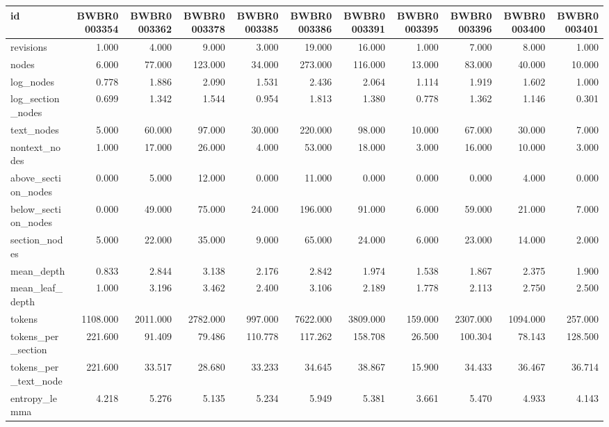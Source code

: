 \begin{tabular}{lrrrrrrrrrr}
\toprule
id & BWBR0003354 & BWBR0003362 & BWBR0003378 & BWBR0003385 & BWBR0003386 & BWBR0003391 & BWBR0003395 & BWBR0003396 & BWBR0003400 & BWBR0003401 \\
\midrule
revisions & 1.000 & 4.000 & 9.000 & 3.000 & 19.000 & 16.000 & 1.000 & 7.000 & 8.000 & 1.000 \\
\cline{1-11}
nodes & 6.000 & 77.000 & 123.000 & 34.000 & 273.000 & 116.000 & 13.000 & 83.000 & 40.000 & 10.000 \\
\cline{1-11}
log\_nodes & 0.778 & 1.886 & 2.090 & 1.531 & 2.436 & 2.064 & 1.114 & 1.919 & 1.602 & 1.000 \\
\cline{1-11}
log\_section\_nodes & 0.699 & 1.342 & 1.544 & 0.954 & 1.813 & 1.380 & 0.778 & 1.362 & 1.146 & 0.301 \\
\cline{1-11}
text\_nodes & 5.000 & 60.000 & 97.000 & 30.000 & 220.000 & 98.000 & 10.000 & 67.000 & 30.000 & 7.000 \\
\cline{1-11}
nontext\_nodes & 1.000 & 17.000 & 26.000 & 4.000 & 53.000 & 18.000 & 3.000 & 16.000 & 10.000 & 3.000 \\
\cline{1-11}
above\_section\_nodes & 0.000 & 5.000 & 12.000 & 0.000 & 11.000 & 0.000 & 0.000 & 0.000 & 4.000 & 0.000 \\
\cline{1-11}
below\_section\_nodes & 0.000 & 49.000 & 75.000 & 24.000 & 196.000 & 91.000 & 6.000 & 59.000 & 21.000 & 7.000 \\
\cline{1-11}
section\_nodes & 5.000 & 22.000 & 35.000 & 9.000 & 65.000 & 24.000 & 6.000 & 23.000 & 14.000 & 2.000 \\
\cline{1-11}
mean\_depth & 0.833 & 2.844 & 3.138 & 2.176 & 2.842 & 1.974 & 1.538 & 1.867 & 2.375 & 1.900 \\
\cline{1-11}
mean\_leaf\_depth & 1.000 & 3.196 & 3.462 & 2.400 & 3.106 & 2.189 & 1.778 & 2.113 & 2.750 & 2.500 \\
\cline{1-11}
tokens & 1108.000 & 2011.000 & 2782.000 & 997.000 & 7622.000 & 3809.000 & 159.000 & 2307.000 & 1094.000 & 257.000 \\
\cline{1-11}
tokens\_per\_section & 221.600 & 91.409 & 79.486 & 110.778 & 117.262 & 158.708 & 26.500 & 100.304 & 78.143 & 128.500 \\
\cline{1-11}
tokens\_per\_text\_node & 221.600 & 33.517 & 28.680 & 33.233 & 34.645 & 38.867 & 15.900 & 34.433 & 36.467 & 36.714 \\
\cline{1-11}
entropy\_lemma & 4.218 & 5.276 & 5.135 & 5.234 & 5.949 & 5.381 & 3.661 & 5.470 & 4.933 & 4.143 \\

\end{tabular}
